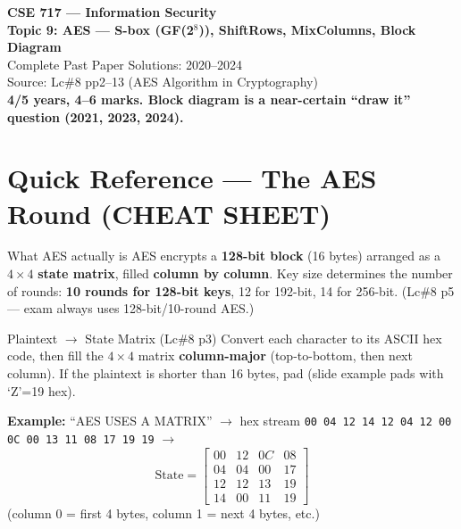 \documentclass[12pt,a4paper]{article}
\begin{document}
\begin{center}
{\LARGE\bfseries\color{folblue} CSE 717 --- Information Security}\\[4pt]
{\large\bfseries Topic 9: AES --- S-box (GF(2$^8$)), ShiftRows, MixColumns, Block Diagram}\\[2pt]
{\large Complete Past Paper Solutions: 2020--2024}\\[6pt]
{\normalsize Source: Lc\#8 pp2--13 (AES Algorithm in Cryptography)}\\[2pt]
{\normalsize\color{darkred}\textbf{4/5 years, 4--6 marks. Block diagram is a near-certain ``draw it'' question (2021, 2023, 2024).}}
\end{center}

\tableofcontents

\section*{Quick Reference --- The AES Round (CHEAT SHEET)}

\begin{warnbox}{What AES actually is}
AES encrypts a \textbf{128-bit block} (16 bytes) arranged as a $4\times4$ \textbf{state matrix}, filled \textbf{column by column}. Key size determines the number of rounds: \textbf{10 rounds for 128-bit keys}, 12 for 192-bit, 14 for 256-bit. (Lc\#8 p5 --- exam always uses 128-bit/10-round AES.)
\end{warnbox}

\begin{algobox}{Plaintext $\to$ State Matrix (Lc\#8 p3)}
Convert each character to its ASCII hex code, then fill the $4\times4$ matrix \textbf{column-major} (top-to-bottom, then next column). If the plaintext is shorter than 16 bytes, pad (slide example pads with `Z'=19 hex).

\textbf{Example:} ``AES USES A MATRIX'' $\to$ hex stream \texttt{00 04 12 14 12 04 12 00 0C 00 13 11 08 17 19 19} $\to$
\[
\text{State}=
\begin{bmatrix}
00 & 12 & 0C & 08\\
04 & 04 & 00 & 17\\
12 & 12 & 13 & 19\\
14 & 00 & 11 & 19
\end{bmatrix}
\]
(column 0 = first 4 bytes, column 1 = next 4 bytes, etc.)
\end{algobox}
\end{document}
